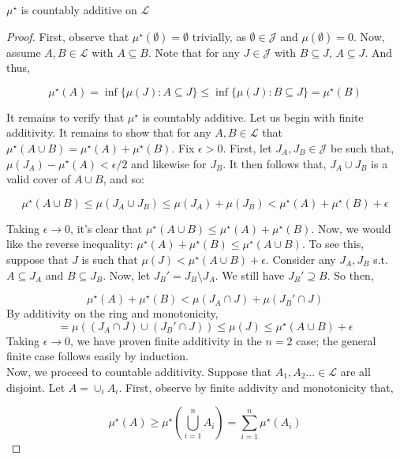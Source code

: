 \begin{theorem}
   $\mu^\star$ is countably additive on $\mathcal L$
\end{theorem}

\begin{proof}

   First, observe that $\mu^\star(\emptyset) = \emptyset$ trivially, as 
   $\emptyset \in \mathcal J$ and $\mu(\emptyset) = 0$. Now, assume 
   $A, B \in \mathcal L$ with $A \subseteq B$. Note that 
   for any $J \in \mathcal J$ with $B \subseteq J$, $A \subseteq J$. And thus, 

   \[ \mu^\star(A) = \inf\{\mu(J) : A \subseteq J\} 
   \leq  \inf\{\mu(J) : B \subseteq J\} = \mu^\star(B)  \]

   It remains to verify that $\mu^\star$ is countably additive. Let us begin with finite additivity. 
   It remains to show that for any $A,B \in \mathcal L$ that $\mu^\star(A \cup B) = \mu^\star(A) + \mu^\star(B)$. 
   Fix $\epsilon > 0$.
   First, let $J_A, J_B \in \mathcal J$ be such that, $\mu(J_A) - \mu^\star(A) < \epsilon/2$ and likewise for 
   $J_B$. It then follows that, $J_A \cup J_B$ is a valid cover of $A \cup B$, and so: 

   \[ \mu^\star(A \cup B) \leq \mu(J_A \cup J_B) \leq \mu(J_A) + \mu(J_B)< \mu^\star(A) + \mu^\star(B) + \epsilon \]

   Taking $\epsilon \to 0$, it's clear that $\mu^\star(A \cup B) \leq \mu^\star(A) + \mu^\star(B)$. Now, we would 
   like the reverse inequality: $\mu^\star(A) + \mu^\star(B)\leq \mu^\star(A \cup B)$. To see this, suppose that 
   $J$ is such that $\mu(J) < \mu^\star(A \cup B) + \epsilon$. Consider any 
   $J_A, J_B$ s.t. $A \subseteq J_A$ and $B \subseteq J_B$. Now, let $J_B' = J_B \setminus J_A$. We still have $J_B' \supseteq B$. 
   So then,

   \[ \mu^\star(A) + \mu^\star(B) < \mu(J_A \cap J) + \mu(J_B' \cap J) \] 
   By additivity on the ring and monotonicity,
   \[  = \mu((J_A \cap J) \cup (J_B' \cap J))\leq \mu(J) \leq \mu^\star(A \cup B) + \epsilon \] 
   Taking $\epsilon \to 0$, we have proven finite additivity in the 
   $n=2$ case; the general finite case follows easily by induction.\\

   Now, we proceed to countable additivity. Suppose that 
   $A_1,A_2... \in \mathcal L$ are all disjoint. Let $A = \cup_i A_i$. First, observe by finite addivity and monotonicity that, 

   \[ \mu^\star(A) \geq \mu^\star(\bigcup_{i=1}^n A_i) = \sum_{i=1}^n \mu^\star(A_i) \]


\end{proof}
